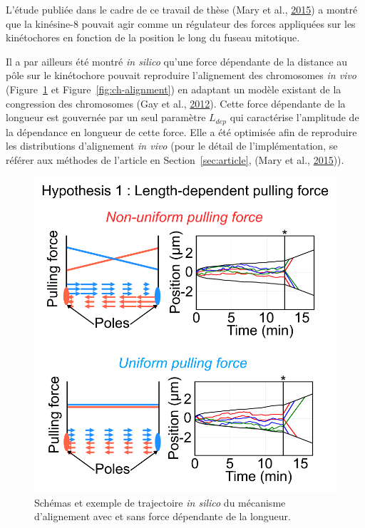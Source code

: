 \documentclass[12pt,a4paper,twoside,openright]{book}
\begin{document}
L'étude publiée dans le cadre de ce travail de thèse (Mary et al.,
\hyperref[ref-Mary2015]{2015}) a montré que la kinésine-8 pouvait agir
comme un régulateur des forces appliquées sur les kinétochores en
fonction de la position le long du fuseau mitotique.

Il a par ailleurs été montré \emph{in silico} qu'une force dépendante de
la distance au pôle sur le kinétochore pouvait reproduire l'alignement
des chromosomes \emph{in vivo} (Figure~\ref{fig:hyp1} et
Figure~\ref{fig:ch-alignment}) en adaptant un modèle existant de la
congression des chromosomes (Gay et al., \hyperref[ref-Gay2012a]{2012}).
Cette force dépendante de la longueur est gouvernée par un seul
paramètre \(L_{dep}\) qui caractérise l'amplitude de la dépendance en
longueur de cette force. Elle a été optimisée afin de reproduire les
distributions d'alignement \emph{in vivo} (pour le détail de
l'implémentation, se référer aux méthodes de l'article en
Section~\ref{sec:article}, (Mary et al.,
\hyperref[ref-Mary2015]{2015})).

\begin{figure}[htbp]
\centering
\includegraphics{figures/results/modelling/hyp1.png}
\caption[Premier mécanisme expliquant l'alignement des chromosomes]{\label{fig:hyp1}Schémas
et exemple de trajectoire \emph{in silico} du mécanisme d'alignement
avec et sans force dépendante de la longueur.}
\end{figure}
\end{document}
